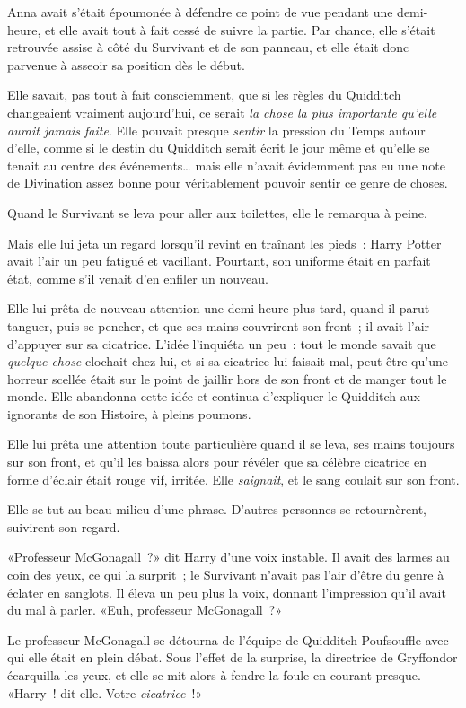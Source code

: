 Anna avait s'était époumonée à défendre ce point de vue pendant une demi-heure, et elle avait tout à fait cessé de suivre la partie. Par chance, elle s'était retrouvée assise à côté du Survivant et de son panneau, et elle était donc parvenue à asseoir sa position dès le début.

Elle savait, pas tout à fait consciemment, que si les règles du Quidditch changeaient vraiment aujourd'hui, ce serait \emph{la chose la plus importante qu'elle aurait jamais faite}. Elle pouvait presque \emph{sentir} la pression du Temps autour d'elle, comme si le destin du Quidditch serait écrit le jour même et qu'elle se tenait au centre des événements… mais elle n'avait évidemment pas eu une note de Divination assez bonne pour véritablement pouvoir sentir ce genre de choses.

Quand le Survivant se leva pour aller aux toilettes, elle le remarqua à peine.

Mais elle lui jeta un regard lorsqu'il revint en traînant les pieds~: Harry Potter avait l'air un peu fatigué et vacillant. Pourtant, son uniforme était en parfait état, comme s'il venait d'en enfiler un nouveau.

Elle lui prêta de nouveau attention une demi-heure plus tard, quand il parut tanguer, puis se pencher, et que ses mains couvrirent son front~; il avait l'air d'appuyer sur sa cicatrice. L'idée l'inquiéta un peu~: tout le monde savait que \emph{quelque chose} clochait chez lui, et si sa cicatrice lui faisait mal, peut-être qu'une horreur scellée était sur le point de jaillir hors de son front et de manger tout le monde. Elle abandonna cette idée et continua d'expliquer le Quidditch aux ignorants de son Histoire, à pleins poumons.

Elle lui prêta une attention toute particulière quand il se leva, ses mains toujours sur son front, et qu'il les baissa alors pour révéler que sa célèbre cicatrice en forme d'éclair était rouge vif, irritée. Elle \emph{saignait}, et le sang coulait sur son front.

Elle se tut au beau milieu d'une phrase. D'autres personnes se retournèrent, suivirent son regard.

«Professeur McGonagall~?» dit Harry d'une voix instable. Il avait des larmes au coin des yeux, ce qui la surprit~; le Survivant n'avait pas l'air d'être du genre à éclater en sanglots. Il éleva un peu plus la voix, donnant l'impression qu'il avait du mal à parler. «Euh, professeur McGonagall~?»

Le professeur McGonagall se détourna de l'équipe de Quidditch Poufsouffle avec qui elle était en plein débat. Sous l'effet de la surprise, la directrice de Gryffondor écarquilla les yeux, et elle se mit alors à fendre la foule en courant presque. «Harry~! dit-elle. Votre \emph{cicatrice}~!»

